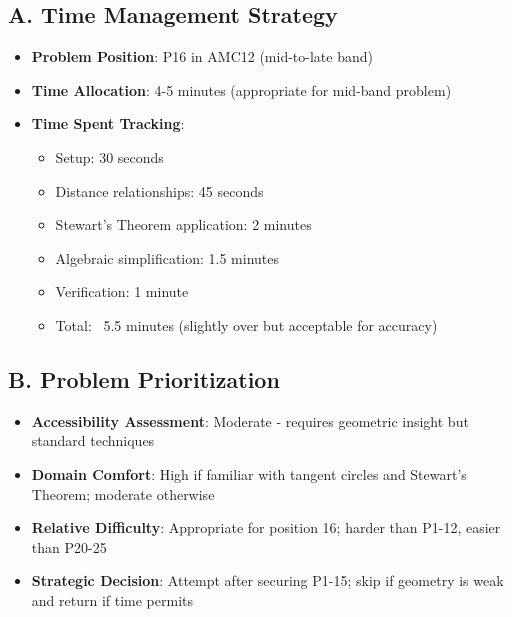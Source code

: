 \documentclass[]{article}
\begin{document}
\begin{competitionbox}
\subsection*{A. Time Management Strategy}
\begin{itemize}[leftmargin=*]
    \item \textbf{Problem Position}: P16 in AMC12 (mid-to-late band)
    \item \textbf{Time Allocation}: 4-5 minutes (appropriate for mid-band problem)
    \item \textbf{Time Spent Tracking}: 
    \begin{itemize}
        \item Setup: 30 seconds
        \item Distance relationships: 45 seconds
        \item Stewart's Theorem application: 2 minutes
        \item Algebraic simplification: 1.5 minutes
        \item Verification: 1 minute
        \item Total: ~5.5 minutes (slightly over but acceptable for accuracy)
    \end{itemize}
\end{itemize}

\subsection*{B. Problem Prioritization}
\begin{itemize}[leftmargin=*]
    \item \textbf{Accessibility Assessment}: Moderate - requires geometric insight but standard techniques
    \item \textbf{Domain Comfort}: High if familiar with tangent circles and Stewart's Theorem; moderate otherwise
    \item \textbf{Relative Difficulty}: Appropriate for position 16; harder than P1-12, easier than P20-25
    \item \textbf{Strategic Decision}: Attempt after securing P1-15; skip if geometry is weak and return if time permits
\end{itemize}


\end{competitionbox}
\end{document}
